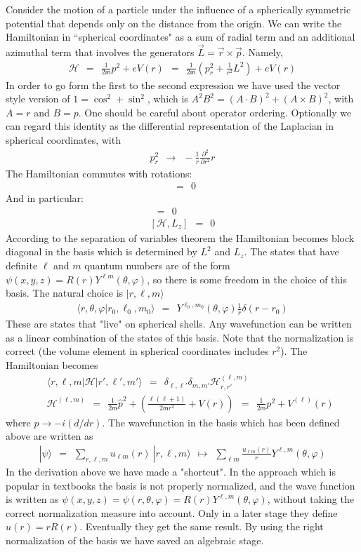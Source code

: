 \documentclass[onecolumn,fleqn]{revtex4}
\newcommand{\mass}{\mathsf{m}}
\newcommand{\beq}{\begin{eqnarray}}
\newcommand{\eeq}{\end{eqnarray}}
\begin{document}
Consider the motion of a particle under 
the influence of a spherically symmetric 
potential that depends only on  
the distance from the origin. We can write 
the Hamiltonian in ``spherical coordinates" 
as a sum of radial term and an additional 
azimuthal term that involves the 
generators $\vec{L}= \vec{r} \times \vec{p}$. 
Namely,    
\beq
\mathcal{H} 
\ \ = \ \ \frac{1}{2\mass} p^2+eV(r) 
\ \ = \ \ \frac{1}{2\mass}\left(p_r^2 + \frac{1}{r^2} L^2\right) + eV(r) 
\eeq
In order to go form the first to the second expression 
we have used the vector style version of ${1=\cos^2+\sin^2}$, 
which is ${ A^2 B^2 = (A \cdot B)^2 +  (A \times B)^2}$, 
with $A=r$ and $B=p$. One should be careful about operator ordering. 
Optionally we can regard this identity as the differential 
representation of the Laplacian in spherical coordinates, with      
\beq
p_r^2 \ \ \rightarrow \ \ -\frac{1}{r}\frac{\partial^2}{\partial r^2} r 
\eeq
The Hamiltonian commutes with rotations:
\beq
[\mathcal{H},\hat{R}] \ \ = \ \ 0
\eeq
And in particular:
\beq
[\mathcal{H},L^2] \ \ = \ \ 0
\\ \nonumber
[\mathcal{H},L_z] \ \ = \ \ 0
\eeq
According to the separation of variables theorem 
the Hamiltonian becomes block diagonal in 
the basis which is determined by $L^2$ and $L_z$.   
The states that have definite $\ell$ 
and $m$ quantum numbers are of the 
form ${\psi(x,y,z) = R(r)Y^{\ell m}(\theta,\varphi)}$, 
so there is some freedom in the choice 
of this basis. The natural choice 
is ${ |r, \ell, m \rangle }$
\beq
\langle r, \theta, \varphi | r_0,\ell_0,m_0 \rangle 
\ \ = \ \ Y^{\ell_0,m_0}(\theta,\varphi) \frac{1}{r} \delta(r-r_0) 
\eeq
These are states that "live" on spherical shells. 
Any wavefunction can be written as a linear 
combination of the states of this basis. Note that 
the normalization is correct (the volume element 
in spherical coordinates includes ${r^2}$). 
The Hamiltonian becomes 
\beq
&& \langle r,\ell,m | \mathcal{H} | r', \ell', m' \rangle 
\ \ = \ \ \delta_{\ell,\ell' }\delta_{m,m'} \mathcal{H}^{(\ell,m)}_{r,r'}
\\ 
&& \mathcal{H}^{(\ell,m)}
\ \ = \ \ \frac{1}{2\mass}\hat{p}^2 
+ \left( \frac{\ell(\ell+1)}{2\mass r^2}+V(r)\right ) 
\ \ = \ \ \frac{1}{2\mass}p^2 + V^{(\ell)}(r) 
\eeq
where ${p \rightarrow -i(d/dr)}$.
The wavefunction in the basis which has been 
defined above are written as  
\beq
|\psi\rangle 
\ \ = \ \ 
\sum_{r,\ell,m} u_{\ell m}(r) \ | r, \ell, m \rangle
\ \ \longmapsto \ \ 
\sum_{\ell m} \frac{u_{\ell m}(r)}{r} Y^{\ell,m}(\theta,\varphi)
\eeq 
In the derivation above we have made a "shortcut". 
In the approach which is popular in textbooks the basis 
is not properly normalized, 
and the wave function is written as 
${\psi(x,y,z) = \psi(r,\theta,\varphi) = R(r) Y^{\ell,m}(\theta,\varphi)}$, 
without taking the correct normalization measure 
into account. Only in a later stage they 
define ${u(r) = rR(r)}$.  
Eventually they get the same result. 
By using the right normalization of the basis 
we have saved an algebraic stage. 
\end{document}

